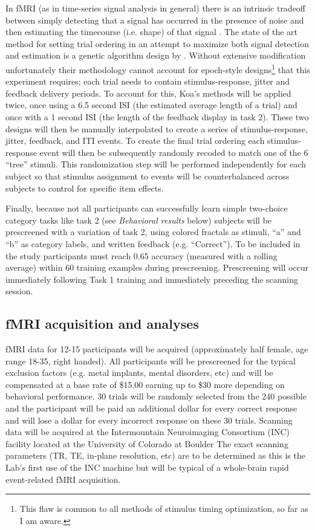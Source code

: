 \documentclass[doc,12pt]{apa}        %
\begin{document}
In fMRI (as in time-series signal analysis in general) there is an intrinsic tradeoff between simply detecting that a signal has occurred in the presence of noise and then estimating the timecourse (i.e. shape) of that signal \cite{Dale:1999p7901,Birn:2002p1777,Liu:2004p2141}.   The state of the art method for setting trial ordering in an attempt to maximize both signal detection and estimation is a genetic algorithm design by .  Without extensive modification unfortunately their methodology cannot account for epoch-style designs\footnote{This flaw is common to all methods of stimulus timing optimization, so far as I am aware.} that this experiment requires; each trial needs to contain stimulus-response, jitter and feedback delivery periods.  To account for this, Koa's methods will be applied twice, once using a 6.5 second ISI (the estimated average length of a trial) and once with a 1 second ISI (the length of the feedback display in task 2).  These two designs will then be manually interpolated to create a series of stimulus-response, jitter, feedback, and ITI events.  To create the final trial ordering each stimulus-response event will then be subsequently randomly recoded to match one of the 6 ``tree'' stimuli.  This randomization step will be performed independently for each subject so that stimulus assignment to events will be counterbalanced across subjects to control for specific item effects.  

Finally, because not all participants can successfully learn simple two-choice category tasks like task 2 (see \emph{Behavioral results} below) subjects will be prescreened with a variation of task 2, using colored fractals as stimuli, ``a'' and ``b'' as category labels, and written feedback (e.g. ``Correct'').  To be included in the study participants must reach 0.65 accuracy (measured with a rolling average) within 60 training examples during prescreening.  Prescreening will occur immediately following Task 1 training and immediately preceding the scanning session.

\subsection{fMRI acquisition and analyses} %
\label{sub:fmri}

fMRI data for 12-15 participants will be acquired (approximately half female, age range 18-35, right handed).   All participants will be prescreened for the typical exclusion factors (e.g. metal implants, mental disorders, etc) and will be compensated at a base rate of \$15.00 earning up to \$30 more depending on behavioral performance. 30 trials will be randomly selected from the 240 possible and the participant will be paid an additional dollar for every correct response and will lose a dollar for every incorrect response on these 30 trials. Scanning data will be acquired at the Intermountain Neuroimaging Consortium (INC) facility located at the University of Colorado at Boulder The exact scanning parameters (TR, TE, in-plane resolution, etc) are to be determined as this is the Lab's first use of the INC machine but will be typical of a whole-brain rapid event-related fMRI acquisition.
\end{document}
